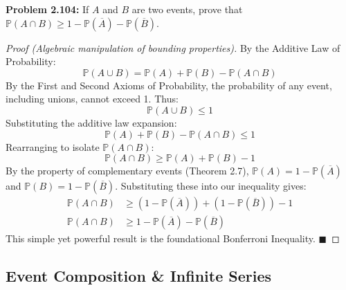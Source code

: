 \documentclass[12pt]{article}
\theoremstyle{definition}
\theoremstyle{remark}
\begin{document}
\textbf{Problem 2.104:} If $A$ and $B$ are two events, prove that $\mathbb{P}(A \cap B) \ge 1 - \mathbb{P}(\overline{A}) - \mathbb{P}(\overline{B})$.
\begin{proof}[Proof (Algebraic manipulation of bounding properties)]
By the Additive Law of Probability:
\[ \mathbb{P}(A \cup B) = \mathbb{P}(A) + \mathbb{P}(B) - \mathbb{P}(A \cap B) \]
By the First and Second Axioms of Probability, the probability of any event, including unions, cannot exceed 1. Thus:
\[ \mathbb{P}(A \cup B) \le 1 \]
Substituting the additive law expansion:
\[ \mathbb{P}(A) + \mathbb{P}(B) - \mathbb{P}(A \cap B) \le 1 \]
Rearranging to isolate $\mathbb{P}(A \cap B)$:
\[ \mathbb{P}(A \cap B) \ge \mathbb{P}(A) + \mathbb{P}(B) - 1 \]
By the property of complementary events (Theorem 2.7), $\mathbb{P}(A) = 1 - \mathbb{P}(\overline{A})$ and $\mathbb{P}(B) = 1 - \mathbb{P}(\overline{B})$. Substituting these into our inequality gives:
\begin{align*}
\mathbb{P}(A \cap B) &\ge (1 - \mathbb{P}(\overline{A})) + (1 - \mathbb{P}(\overline{B})) - 1 \\
\mathbb{P}(A \cap B) &\ge 1 - \mathbb{P}(\overline{A}) - \mathbb{P}(\overline{B})
\end{align*}
This simple yet powerful result is the foundational Bonferroni Inequality. $\blacksquare$
\end{proof}

\subsection{Event Composition & Infinite Series}
\end{document}
